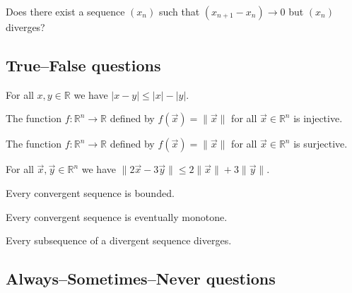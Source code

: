 \begin{chapex}
Does there exist a sequence $(x_n)$ such that $(x_{n+1} - x_n) \to 0$ but $(x_n)$ diverges?
\end{chapex}

\subsection*{True--False questions}


\begin{chapex} %
\label{cqRealNumbersTFBegin}
For all $x,y \in \mathbb{R}$ we have $|x-y| \le |x| - |y|$.
\end{chapex}

\begin{chapex} %
The function $f : \mathbb{R}^n \to \mathbb{R}$ defined by $f(\vec x) = \lVert \vec x \rVert$ for all $\vec x \in \mathbb{R}^n$ is injective.
\end{chapex}

\begin{chapex} %
The function $f : \mathbb{R}^n \to \mathbb{R}$ defined by $f(\vec x) = \lVert \vec x \rVert$ for all $\vec x \in \mathbb{R}^n$ is surjective.
\end{chapex}

\begin{chapex} %
For all $\vec x, \vec y \in \mathbb{R}^n$ we have $\lVert 2\vec x - 3\vec y \rVert \le 2\lVert \vec x \rVert + 3\lVert \vec y \rVert$.
\end{chapex}

\begin{chapex} %
Every convergent sequence is bounded.
\end{chapex}

\begin{chapex} %
Every convergent sequence is eventually monotone.
\end{chapex}

\begin{chapex} %
\label{cqRealNumbersTFEnd}
Every subsequence of a divergent sequence diverges.
\end{chapex}

\subsection*{Always--Sometimes--Never questions}


